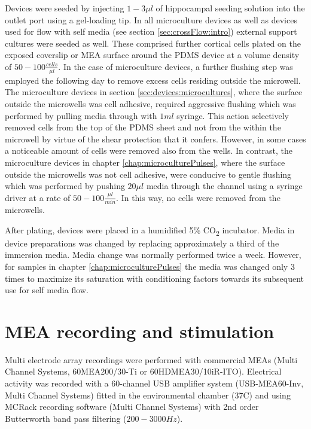  Devices were seeded by injecting \(1-3\mu l\) of hippocampal seeding solution into the outlet port using a gel-loading tip. In all microculture devices as well as devices used for flow with self media (see section \ref{sec:crossFlow:intro}) external support cultures were seeded as well. These comprised further cortical cells plated on the exposed coverslip or MEA surface around the PDMS device at a volume density of \(50-100 \frac{cells}{\mu l}\). In the case of microculture devices, a further flushing step was employed the following day to remove excess cells residing outside the microwell. The microculture devices in section \ref{sec:devices:microcultures}, where the surface outside the microwells was cell adhesive, required aggressive flushing which was performed by pulling media through with \(1ml\) syringe. This action selectively removed cells from the top of the PDMS sheet and not from the within the microwell by virtue of the shear protection that it confers. However, in some cases a noticeable amount of cells were removed also from the wells. In contrast, the microculture devices in chapter \ref{chap:microculturePulses}, where the surface outside the microwells was not cell adhesive, were conducive to gentle flushing which was performed by pushing \(20\mu l\) media through the channel using a syringe driver at a rate of \(50-100\frac{\mu l}{min}\). In this way, no cells were removed from the microwells.

 After plating, devices were placed in a humidified 5\% CO\textsubscript{2} incubator. Media in device preparations was changed by replacing approximately a third of the immersion media. Media change was normally performed twice a week. However, for samples in chapter \ref{chap:microculturePulses} the media was changed only 3 times to maximize its saturation with conditioning factors towards its subsequent use for self media flow.


         \label{sec:methods:culture}

\section{MEA recording and stimulation}
Multi electrode array recordings were performed with commercial MEAs (Multi Channel Systems, 60MEA200/30-Ti or 60HDMEA30/10iR-ITO). Electrical activity was recorded with a 60-channel USB amplifier system (USB-MEA60-Inv, Multi Channel Systems) fitted in the environmental chamber (37\degree C) and using MCRack recording software (Multi Channel Systems) with 2nd order Butterworth band pass filtering (\(200-3000Hz\)).

